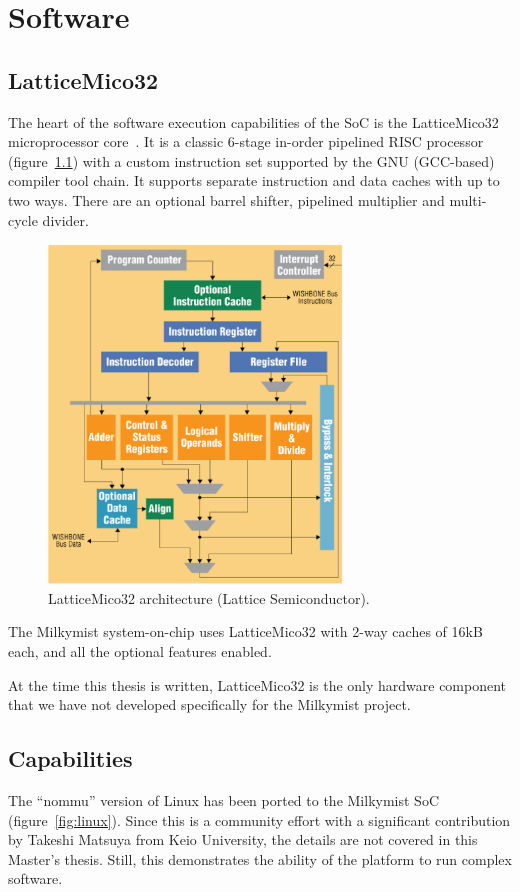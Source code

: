 \documentclass[a4paper,11pt]{kthesis}
\begin{document}
\chapter{Software}
\label{ch:sw}
\section{LatticeMico32}
\label{sec:mico32}
The heart of the software execution capabilities of the SoC is the LatticeMico32 microprocessor core~\cite{mico32}. It is a classic 6-stage in-order pipelined RISC processor (figure~\ref{fig:lm32arch}) with a custom instruction set supported by the GNU (GCC-based) compiler tool chain. It supports separate instruction and data caches with up to two ways. There are an optional barrel shifter, pipelined multiplier and multi-cycle divider.

\begin{figure}[htp]
\centering
\includegraphics[height=90mm]{lm32arch.eps}
\caption{LatticeMico32 architecture (Lattice Semiconductor).}
\label{fig:lm32arch}
\end{figure}

The Milkymist system-on-chip uses LatticeMico32 with 2-way caches of 16kB each, and all the optional features enabled.

At the time this thesis is written, LatticeMico32 is the only hardware component that we have not developed specifically for the Milkymist project.

\section{Capabilities}
The ``nommu'' version of Linux has been ported to the Milkymist SoC (figure~\ref{fig:linux}). Since this is a community effort with a significant contribution by Takeshi Matsuya from Keio University, the details are not covered in this Master's thesis. Still, this demonstrates the ability of the platform to run complex software.
\end{document}
